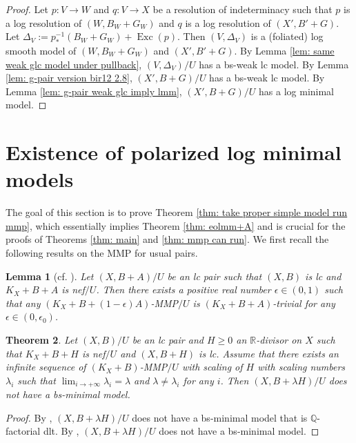 \documentclass[11pt]{amsart}
\numberwithin{equation}{section}
\newcommand{\Qq}{\mathbb{Q}}
\newcommand{\Rr}{\mathbb{R}}
\newcommand{\Exc}{\operatorname{Exc}}
\newtheorem{thm}{Theorem}[section]
\newtheorem{lem}[thm]{Lemma}
\theoremstyle{definition}
\theoremstyle{definition}
\theoremstyle{definition}
\begin{document}
\begin{proof}
Let $p: V\rightarrow W$ and $q: V\rightarrow X$ be a resolution of indeterminacy such that $p$ is a log resolution of $(W,B_W+G_W)$ and $q$ is a log resolution of $(X',B'+G)$. Let $\Delta_V:=p^{-1}_*(B_W+G_W)+\Exc(p)$. Then $(V,\Delta_V)$ is a (foliated) log smooth model of $(W,B_W+G_W)$ and $(X',B'+G)$. By Lemma \ref{lem: same weak glc model under pullback}, $(V,\Delta_V)/U$ has a bs-weak lc model. By Lemma \ref{lem: g-pair version bir12 2.8}, $(X',B+G)/U$ has a bs-weak lc model. By Lemma \ref{lem: g-pair weak glc imply lmm}, $(X',B+G)/U$ has a log minimal model.
\end{proof}






\section{Existence of polarized log minimal models}\label{sec: eolmm}

The goal of this section is to prove Theorem \ref{thm: take proper simple model run mmp}, which essentially implies Theorem \ref{thm: eolmm+A} and is crucial for the proofs of Theorems \ref{thm: main} and \ref{thm: mmp can run}. We first recall the following results on the MMP for usual pairs.


\begin{lem}[{cf. \cite[Lemma 2.20]{TX23}}]\label{lem: tx23 2.20}
    Let $(X,B+A)/U$ be an lc pair such that $(X,B)$ is lc and $K_X+B+A$ is nef$/U$. Then there exists a positive real number $\epsilon\in (0,1)$ such that any $(K_X+B+(1-\epsilon)A)$-MMP$/U$ is $(K_X+B+A)$-trivial for any $\epsilon\in (0,\epsilon_0)$.
\end{lem}

\begin{thm}\label{thm: bir12 1.9(3)}
     Let $(X,B)/U$ be an lc pair and $H\geq 0$ an $\Rr$-divisor on $X$ such that $K_X+B+H$ is nef$/U$ and $(X,B+H)$ is lc. Assume that there exists an infinite sequence of $(K_X+B)$-MMP$/U$ with scaling of $H$ with scaling numbers $\lambda_i$ such that $\lim_{i\rightarrow+\infty}\lambda_i=\lambda$ and $\lambda\not=\lambda_i$ for any $i$. Then $(X,B+\lambda H)/U$ does not have a bs-minimal model.
\end{thm}
\begin{proof}
By \cite[Theorem 1.9(3)]{Bir12}, $(X,B+\lambda H)/U$ does not have a bs-minimal model that is $\Qq$-factorial dlt. By \cite[Corollary 3.7]{Bir12}, $(X,B+\lambda H)/U$ does not have a bs-minimal model.
\end{proof}
\end{document}
